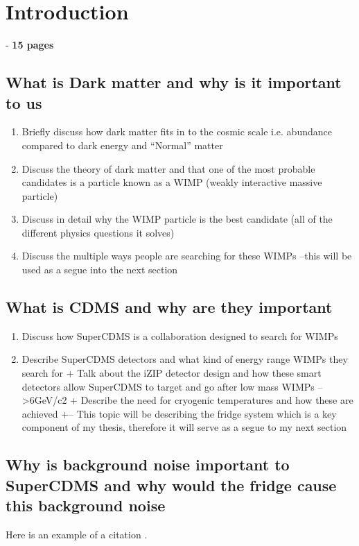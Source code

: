 \section{Introduction}- \textbf{15 pages}

\subsection{What is Dark matter and why is it important to us} \label{sec:darkmatter}
\begin{figure}
\label{fig:galaxies}
\end{figure}

\begin{enumerate}
    \item Briefly discuss how dark matter fits in to the cosmic scale i.e. abundance compared to dark energy and “Normal” matter
    \item Discuss the theory of dark matter and that one of the most probable candidates is a particle known as a WIMP (weakly interactive massive particle)
    \item Discuss in detail why the WIMP particle is the best candidate (all of the different physics questions it solves)
    \item Discuss the multiple ways people are searching for these WIMPs –this will be used as a segue into the next section
\end{enumerate}

\subsection{What is CDMS and why are they important}

\begin{enumerate}
    \item Discuss how SuperCDMS is a collaboration designed to search for WIMPs
    \item Describe SuperCDMS detectors and what kind of energy range WIMPs they search for
        + Talk about the iZIP detector design and how these smart detectors allow SuperCDMS to target and go after low mass WIMPs –   >6GeV/c2
        + Describe the need for cryogenic temperatures and how these are achieved
        +--	This topic will be describing the fridge system which is a key component of my thesis, therefore it will serve as a segue to my next section
\end{enumerate}

\subsection{	Why is background noise important to SuperCDMS and why would the fridge cause this background noise}
Here is an example of a citation \cite{pyle2012}.

